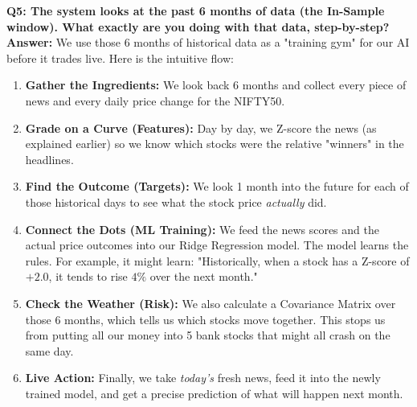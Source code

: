 \documentclass[11pt, a4paper]{article}
\begin{document}
\textbf{\textcolor{IITBlue}{Q5: The system looks at the past 6 months of data (the In-Sample window). What exactly are you doing with that data, step-by-step?}} \\
\textbf{Answer:} We use those 6 months of historical data as a "training gym" for our AI before it trades live. Here is the intuitive flow:
\begin{enumerate}
    \item \textbf{Gather the Ingredients:} We look back 6 months and collect every piece of news and every daily price change for the NIFTY50.
    \item \textbf{Grade on a Curve (Features):} Day by day, we Z-score the news (as explained earlier) so we know which stocks were the relative "winners" in the headlines.
    \item \textbf{Find the Outcome (Targets):} We look 1 month into the future for each of those historical days to see what the stock price \textit{actually} did.
    \item \textbf{Connect the Dots (ML Training):} We feed the news scores and the actual price outcomes into our Ridge Regression model. The model learns the rules. For example, it might learn: "Historically, when a stock has a Z-score of $+2.0$, it tends to rise $4\%$ over the next month."
    \item \textbf{Check the Weather (Risk):} We also calculate a Covariance Matrix over those 6 months, which tells us which stocks move together. This stops us from putting all our money into 5 bank stocks that might all crash on the same day.
    \item \textbf{Live Action:} Finally, we take \textit{today's} fresh news, feed it into the newly trained model, and get a precise prediction of what will happen next month.
\end{enumerate}
\end{document}
